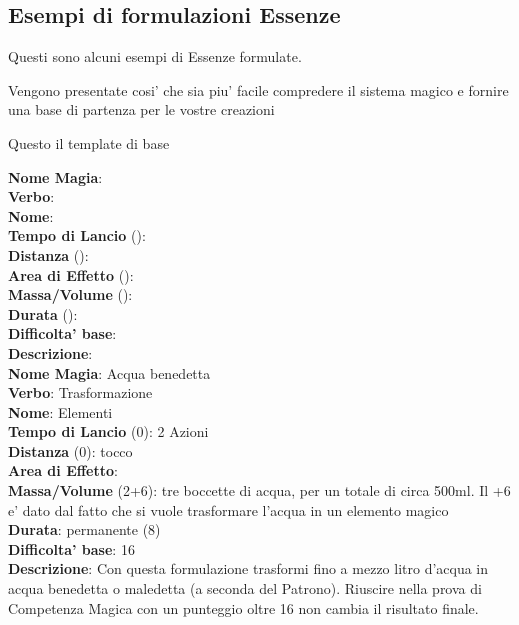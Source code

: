 \subsection{Esempi di formulazioni Essenze}

Questi sono alcuni esempi di Essenze formulate.

Vengono presentate cosi' che sia piu' facile compredere il sistema magico e fornire una base di partenza per le vostre creazioni


Questo il template di base


\flushleft \textbf{Nome Magia}: \\ 
\textbf{Verbo}: \\
\textbf{Nome}: \\
\textbf{Tempo di Lancio} (): \\
\textbf{Distanza} (): \\
\textbf{Area di Effetto} (): \\
\textbf{Massa/Volume} (): \\
\textbf{Durata} (): \\
\textbf{Difficolta' base}: \\
\textbf{Descrizione}: \\


\flushleft \textbf{Nome Magia}: Acqua benedetta\\  
\textbf{Verbo}: Trasformazione\\
\textbf{Nome}: Elementi\\
\textbf{Tempo di Lancio} (0): 2 Azioni\\
\textbf{Distanza} (0): tocco\\
\textbf{Area di Effetto}: \\
\textbf{Massa/Volume} (2+6): tre boccette di acqua, per un totale di circa 500ml. Il +6 e' dato dal fatto che si vuole trasformare l'acqua in un elemento magico\\
\textbf{Durata}: permanente (8)\\
\textbf{Difficolta' base}: 16\\
\textbf{Descrizione}: Con questa formulazione trasformi fino a mezzo litro d'acqua in acqua benedetta o maledetta (a seconda del Patrono). Riuscire nella prova di Competenza Magica con un punteggio oltre 16 non cambia il risultato finale.\\


